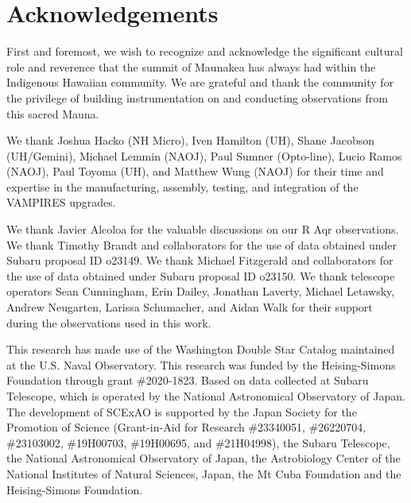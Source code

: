 \section*{Acknowledgements}
First and foremost, we wish to recognize and acknowledge the significant cultural role and reverence that the summit of Maunakea has always had within the Indigenous Hawaiian community. We are grateful and thank the community for the privilege of building instrumentation on and conducting observations from this sacred Mauna.

We thank Joshua Hacko (NH Micro), Iven Hamilton (UH), Shane Jacobson (UH/Gemini), Michael Lemmin (NAOJ), Paul Sumner (Opto-line), Lucio Ramos (NAOJ), Paul Toyoma (UH), and Matthew Wung (NAOJ) for their time and expertise in the manufacturing, assembly, testing, and integration of the VAMPIRES upgrades.

We thank Javier Alcoloa for the valuable discussions on our R Aqr observations. We thank Timothy Brandt and collaborators for the use of data obtained under Subaru proposal ID o23149. We thank Michael Fitzgerald and collaborators for the use of data obtained under Subaru proposal ID o23150. We thank telescope operators Sean Cunningham, Erin Dailey, Jonathan Laverty, Michael Letawsky, Andrew Neugarten, Larissa Schumacher, and Aidan Walk for their support during the observations used in this work.

This research has made use of the Washington Double Star Catalog maintained at the U.S. Naval Observatory. This research was funded by the Heising-Simons Foundation through grant \#2020-1823. Based on data collected at Subaru Telescope, which is operated by the National Astronomical Observatory of Japan. The development of SCExAO is supported by the Japan Society for the Promotion of Science (Grant-in-Aid for Research \#23340051, \#26220704, \#23103002, \#19H00703, \#19H00695, and \#21H04998), the Subaru Telescope, the National Astronomical Observatory of Japan, the Astrobiology Center of the National Institutes of Natural Sciences, Japan, the Mt Cuba Foundation and the Heising-Simons Foundation.
